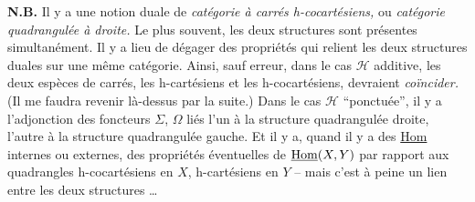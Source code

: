 
\textbf{N.B.} Il y a une notion duale de \textit{catégorie à carrés h-cocartésiens,} ou \textit{catégorie quadrangulée à droite.} Le plus souvent, les deux structures sont présentes simultanément. Il y a lieu de dégager des propriétés qui relient les deux structures duales sur une même catégorie. Ainsi, sauf erreur, dans le cas $\mathcal{H}$ additive, les deux espèces de carrés, les h-cartésiens et les h-cocartésiens, devraient \textit{coïncider.} (Il me faudra revenir là-dessus par la suite.) Dans le cas $\mathcal{H}$ ``ponctuée'', il y a l'adjonction des foncteurs $\Sigma$, $\Omega$ liés l'un à la structure quadrangulée droite, l'autre à la structure quadrangulée gauche. Et il y a, quand il y a des \underline{Hom} internes ou externes, des propriétés éventuelles de $\underline{\operatorname{Hom}}(X,Y)$ par rapport aux quadrangles h-cocartésiens en $X$, h-cartésiens en $Y$ -- mais c'est à peine un lien entre les deux structures \ldots

